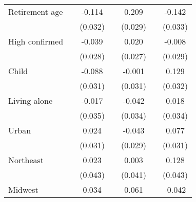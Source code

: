 {\begin{tabular}{l*{6}{c}}
\addlinespace
Retirement age      &                     &      -0.114\sym{***}&                     &       0.209\sym{***}&                     &      -0.142\sym{***}\\
                    &                     &     (0.032)         &                     &     (0.029)         &                     &     (0.033)         \\
\addlinespace
High confirmed      &                     &      -0.039         &                     &       0.020         &                     &      -0.008         \\
                    &                     &     (0.028)         &                     &     (0.027)         &                     &     (0.029)         \\
\addlinespace
Child               &                     &      -0.088\sym{***}&                     &      -0.001         &                     &       0.129\sym{***}\\
                    &                     &     (0.031)         &                     &     (0.031)         &                     &     (0.032)         \\
\addlinespace
Living alone        &                     &      -0.017         &                     &      -0.042         &                     &       0.018         \\
                    &                     &     (0.035)         &                     &     (0.034)         &                     &     (0.034)         \\
\addlinespace
Urban               &                     &       0.024         &                     &      -0.043         &                     &       0.077\sym{**} \\
                    &                     &     (0.031)         &                     &     (0.029)         &                     &     (0.031)         \\
\addlinespace
Northeast           &                     &       0.023         &                     &       0.003         &                     &       0.128\sym{***}\\
                    &                     &     (0.043)         &                     &     (0.041)         &                     &     (0.043)         \\
\addlinespace
Midwest             &                     &       0.034         &                     &       0.061\sym{*}  &                     &      -0.042         \\

\end{tabular}}
